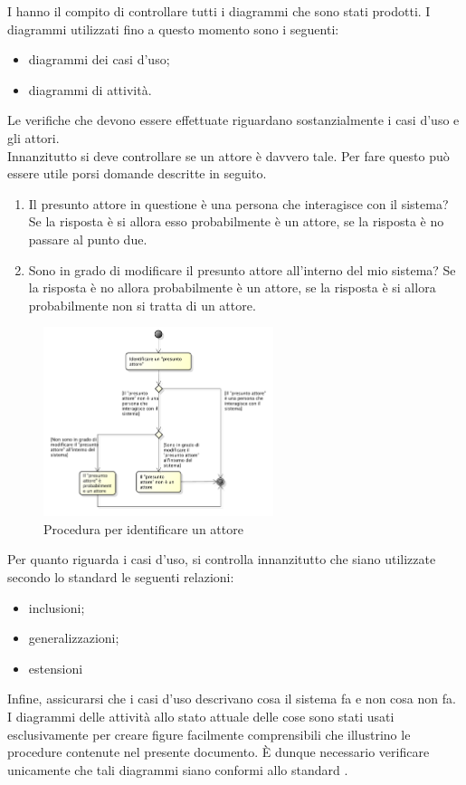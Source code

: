 			I  hanno il compito di controllare tutti i diagrammi  che sono stati prodotti. I diagrammi utilizzati fino a questo momento 
			sono i seguenti:
			\begin{itemize}
				\item diagrammi dei casi d'uso;
				\item diagrammi di attività.
			\end{itemize}
				Le verifiche che devono essere effettuate riguardano sostanzialmente i casi d'uso e gli attori.\\
				Innanzitutto si deve controllare se un attore è davvero tale. Per fare questo può essere utile porsi domande descritte in seguito.
				\begin{enumerate}
					\item Il presunto attore in questione è una persona che interagisce con il sistema? Se la risposta è si allora esso probabilmente è un attore, se la risposta è no passare al punto due.
					\item Sono in grado di modificare il presunto attore all'interno del mio sistema? Se la risposta è no allora probabilmente è un attore, se la risposta è si allora probabilmente non si tratta di un attore.
				\end{enumerate}
				\begin{figure}[H]
					\centering
					\includegraphics[width=0.6\textwidth]{NormeDiProgetto/Pics/VerificaAttori}
					\caption{Procedura per identificare un attore}
				\end{figure}
				Per quanto riguarda i casi d'uso, si controlla innanzitutto che siano utilizzate secondo lo standard  le seguenti relazioni:
				\begin{itemize}
					\item inclusioni;
					\item generalizzazioni;
					\item estensioni
				\end{itemize}
				Infine, assicurarsi che i casi d'uso descrivano cosa il sistema fa e non cosa non fa.
				I diagrammi delle attività allo stato attuale delle cose sono stati usati esclusivamente per creare figure facilmente comprensibili che illustrino le procedure contenute nel presente documento. È dunque necessario verificare unicamente che tali diagrammi siano conformi allo standard .	
		
